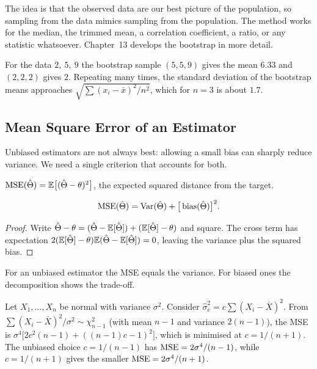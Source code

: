 The idea is that the observed data are our best picture of the population, so sampling from the data mimics sampling from the population. The method works for the median, the trimmed mean, a correlation coefficient, a ratio, or any statistic whatsoever. Chapter~13 develops the bootstrap in more detail.

\begin{example}
For the data $2,\ 5,\ 9$ the bootstrap sample $(5,5,9)$ gives the mean $6.33$ and $(2,2,2)$ gives $2$. Repeating many times, the standard deviation of the bootstrap means approaches $\sqrt{\sum(x_i-\bar{x})^2/n^2}$, which for $n=3$ is about $1.7$.
\end{example}

\subsection{Mean Square Error of an Estimator}\label{sec:mse}

Unbiased estimators are not always best: allowing a small bias can sharply reduce variance. We need a single criterion that accounts for both.

\begin{definition}
$\operatorname{MSE}(\hat\Theta)=\mathbb{E}\big[(\hat\Theta-\theta)^2\big]$, the expected squared distance from the target.
\end{definition}

\begin{theorem}\label{thm:biasvar}
\[ \operatorname{MSE}(\hat\Theta)=\operatorname{Var}(\hat\Theta)+\big[\operatorname{bias}(\hat\Theta)\big]^2. \]
\end{theorem}

\begin{proof}
Write $\hat\Theta-\theta=(\hat\Theta-\mathbb{E}[\hat\Theta])+(\mathbb{E}[\hat\Theta]-\theta)$ and square. The cross term has expectation $2(\mathbb{E}[\hat\Theta]-\theta)\mathbb{E}(\hat\Theta-\mathbb{E}[\hat\Theta])=0$, leaving the variance plus the squared bias.
\end{proof}

For an unbiased estimator the MSE equals the variance. For biased ones the decomposition shows the trade-off.

\begin{example}\label{ex:mseexample}
Let $X_1,\dots,X_n$ be normal with variance $\sigma^2$. Consider $\hat\sigma^2_c=c\sum(X_i-\bar{X})^2$. From $\sum(X_i-\bar{X})^2/\sigma^2\sim\chi^2_{n-1}$ (with mean $n-1$ and variance $2(n-1)$), the MSE is $\sigma^4\big[2c^2(n-1)+((n-1)c-1)^2\big]$, which is minimised at $c=1/(n+1)$. The unbiased choice $c=1/(n-1)$ has $\operatorname{MSE}=2\sigma^4/(n-1)$, while $c=1/(n+1)$ gives the smaller $\operatorname{MSE}=2\sigma^4/(n+1)$.
\end{example}

